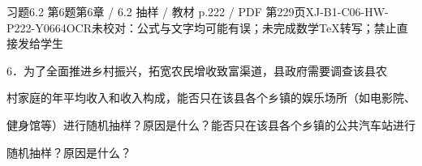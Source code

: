 \begin{bankitem}{习题6.2 第6题}{第6章 / 6.2 抽样 / 教材 p.222 / PDF 第229页}{XJ-B1-C06-HW-P222-Y0664}{OCR未校对：公式与文字均可能有误；未完成数学TeX转写；禁止直接发给学生}
\begin{ocrdraft}
\par
6．为了全面推进乡村振兴，拓宽农民增收致富渠道，县政府需要调查该县农
\par
村家庭的年平均收入和收入构成，能否只在该县各个乡镇的娱乐场所（如电影院、
\par
健身馆等）进行随机抽样？原因是什么？能否只在该县各个乡镇的公共汽车站进行
\par
随机抽样？原因是什么？
\end{ocrdraft}
\end{bankitem}
